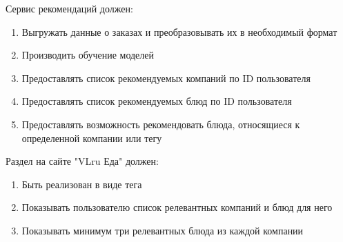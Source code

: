 Сервис рекомендаций должен:
\begin{enumerate}
  \item Выгружать данные о заказах и преобразовывать их в необходимый формат
  \item Производить обучение моделей
  \item Предоставлять список рекомендуемых компаний по ID пользователя
  \item Предоставлять список рекомендуемых блюд по ID пользователя
  \item Предоставлять возможность рекомендовать блюда, относящиеся к определенной
  компании или тегу
\end{enumerate}

Раздел на сайте "VLru Еда" должен:
\begin{enumerate}
  \item Быть реализован в виде тега
  \item Показывать пользователю список релевантных компаний и блюд для него
  \item Показывать минимум три релевантных блюда из каждой компании
\end{enumerate}
